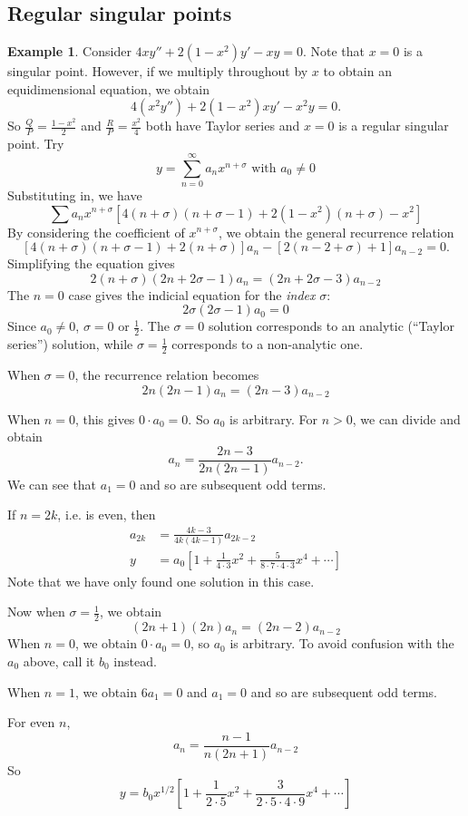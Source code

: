\documentclass[a4paper]{article}
\theoremstyle{definition}
\newtheorem*{eg}{Example}
\begin{document}
\subsection{Regular singular points}
\begin{eg}
  Consider $4xy'' + 2(1 - x^2)y' - xy = 0$. Note that $x = 0$ is a singular point. However, if we multiply throughout by $x$ to obtain an equidimensional equation, we obtain
\[
4(x^2 y'') + 2(1 - x^2)xy' - x^2 y = 0.
\]
So $\frac{Q}{P} = \frac{1 - x^2}{2}$ and $\frac{R}{P} = \frac{x^2}{4}$ both have Taylor series and $x = 0$ is a regular singular point. Try
\[
y = \sum_{n = 0}^\infty a_n x^{n + \sigma}\text{ with }a_0 \not= 0
\]
Substituting in, we have
\[
\sum a_n x^{n + \sigma}[4(n + \sigma)(n + \sigma - 1) + 2(1 - x^2)(n + \sigma) - x^2]
\]
By considering the coefficient of $x^{n + \sigma}$, we obtain the general recurrence relation
\[
[4(n + \sigma)(n + \sigma - 1) + 2(n + \sigma)]a_n -[2(n - 2 + \sigma) + 1]a_{n - 2} = 0.
\]
Simplifying the equation gives
\[
2(n + \sigma)(2n + 2\sigma - 1)a_n = (2n + 2\sigma-3)a_{n - 2}
\]
The $n = 0$  case gives the indicial equation for the \emph{index} $\sigma$:
\[
2\sigma(2\sigma - 1)a_0 = 0
\]
Since $a_0 \not= 0$, $\sigma = 0$ or $\frac{1}{2}$. The $\sigma = 0$ solution corresponds to an analytic (``Taylor series'') solution, while $\sigma = \frac{1}{2}$ corresponds to a non-analytic one.

When $\sigma = 0$, the recurrence relation becomes
\[
2n(2n - 1)a_n = (2n - 3)a_{n - 2}
\]

When $n = 0$, this gives $0\cdot a_0 = 0$. So $a_0$ is arbitrary. For $n >0$, we can divide and obtain
\[
a_n = \frac{2n - 3}{2n(2n - 1)}a_{n - 2}.
\]
We can see that $a_1 = 0$ and so are subsequent odd terms.

If $n = 2k$, i.e. is even, then
\begin{align*}
  a_{2k} &= \frac{4k - 3}{4k(4k - 1)}a_{2k - 2}\\
  y &= a_0\left[1 + \frac{1}{4\cdot 3}x^2 + \frac{5}{8\cdot 7\cdot 4\cdot 3}x^4 + \cdots\right]
\end{align*}
Note that we have only found one solution in this case.

Now when $\sigma = \frac{1}{2}$, we obtain
\[
(2n + 1)(2n)a_n = (2n - 2)a_{n - 2}
\]
When $n = 0$, we obtain $0\cdot a_0 = 0$, so $a_0$ is arbitrary. To avoid confusion with the $a_0$ above, call it $b_0$ instead.

When $n = 1$, we obtain $6a_1 = 0$ and $a_1 = 0$ and so are subsequent odd terms.

For even $n$,
\[
a_n = \frac{n - 1}{n(2n + 1)}a_{n - 2}
\]
So 
\[
y = b_0 x^{1/2}\left[1 + \frac{1}{2\cdot 5}x^2 + \frac{3}{2\cdot 5\cdot 4\cdot 9}x^4 + \cdots\right]
\]
\end{eg}
\end{document}
